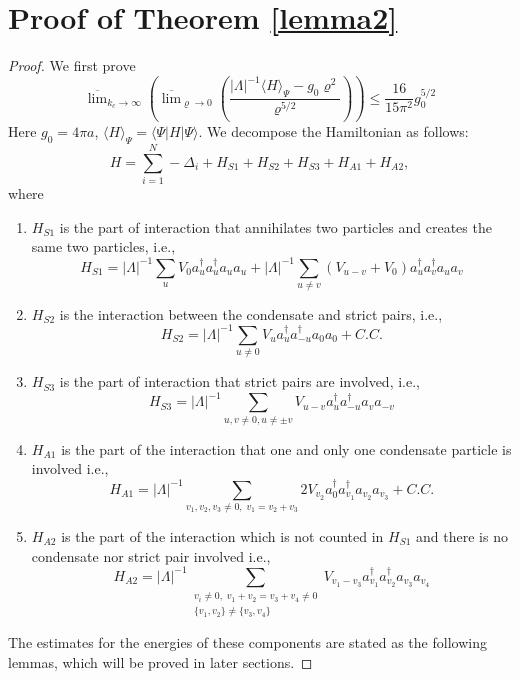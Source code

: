 \documentclass[11pt]{article}
\numberwithin{equation}{section}
\newcommand{\beq}{\begin{equation}}
\newcommand{\eeq}{\end{equation}}
\renewcommand\rho\varrho
\theoremstyle{definition}
\begin{document}
\section{Proof of Theorem \ref{lemma2}}
\begin{proof}
We first prove
\beq\label{Maindesired}
\overline
\lim_{k_c\to\infty}
  \left(\overline\lim_{\rho\to0}
     \left(
         \frac{|\Lambda|^{-1}\langle H\rangle_\Psi-g_0\rho^2}
         {\rho^{5/2}}
      \right)
  \right)
\leq \frac{16}{15\pi^2}g_0^{5/2}
\eeq
Here $g_0=4\pi a$, $\langle H\rangle_\Psi=\langle\Psi|H|\Psi\rangle$. We decompose the Hamiltonian as follows:
\beq
H=\sum_{i=1}^N-\Delta_i+H_{S1}+H_{S2}+H_{S3}+H_{A1}+H_{A2},
\eeq
where 
\begin{enumerate}
	\item $H_{S1}$ is the part of interaction that annihilates two particles and creates the same two particles, i.e.,
	\beq
	H_{S1}= |\Lambda|^{-1} \sum_{u}V_{0}a^\dagger_u a^\dagger_u a_u a_u+ |\Lambda|^{-1} \sum_{u\neq v}(V_{u-v}+V_{0})a^\dagger_u a^\dagger_v a_u a_v
	\eeq
	\item $H_{S2}$ is the interaction between the condensate and strict pairs, i.e., 
	\beq
 H_{S2}=	|\Lambda|^{-1}\sum_{u\neq 0}V_{u}a^\dagger_u a^\dagger_{-u} a_0 a_0+C.C.
	\eeq
	\item $H_{S3}$ is the part of interaction that strict pairs are involved, i.e., 
	\beq
	H_{S3}=|\Lambda|^{-1} \sum_{u, v\neq 0, u\neq \pm v} V_{u-v}a^\dagger_u a^\dagger_{-u} a_v a_{-v}
	\eeq
	\item $H_{A1}$ is the part of the  interaction that one and only one condensate particle is involved i.e., 
	\beq
	H_{A1}=|\Lambda|^{-1} \sum_{v_1,v_2,v_3 \neq 0,\; v_1=v_2+v_3}2V_{v_2}a^\dagger_0 a^\dagger_{v_1} a_{v_2} a_{v_3}+C.C.
	\eeq
	\item $H_{A2}$ is the part of the  interaction which is not counted in $H_{S1}$ and there is no condensate nor strict pair involved i.e., 
	\beq
	H_{A2}= |\Lambda|^{-1} \sum_{\substack{v_i \neq 0,\; v_1+v_2=v_3+v_4\neq 0\\ \{v_1,v_2\}\neq \{v_3,v_4\}}}V_{v_1-v_3}a^\dagger_{v_1} a^\dagger_{v_2} a_{v_3} a_{v_4}
	\eeq
\end{enumerate} 
The estimates for the energies of these components are stated as the following lemmas, which will be proved 
in later sections. 


\end{proof}
\end{document}
